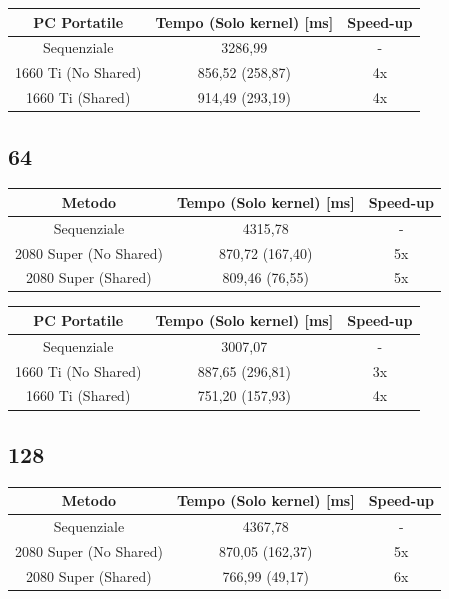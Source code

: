 \documentclass[12pt,a4paper]{report}
\begin{document}
				\bigbreak
				
				\begin{tabular}{|c|c|c|}
					\hline
					PC Portatile & Tempo (Solo kernel) [ms] & Speed-up \\
					\hline
					Sequenziale & 3286,99 & -  \\
					\hline
					1660 Ti (No Shared) & 856,52 (258,87) & 4x \\
					\hline
					1660 Ti (Shared) & 914,49 (293,19) & 4x \\
					\hline
				\end{tabular}

			\subsection{64}
			
				\begin{tabular}{|c|c|c|}
					\hline
					Metodo & Tempo (Solo kernel) [ms] & Speed-up \\
					\hline
					Sequenziale & 4315,78 & -  \\
					\hline
					2080 Super (No Shared) & 870,72 (167,40) & 5x \\
					\hline
					2080 Super (Shared) & 809,46 (76,55) & 5x \\
					\hline
				\end{tabular}
				
				\bigbreak
				
				\begin{tabular}{|c|c|c|}
					\hline
					PC Portatile & Tempo (Solo kernel) [ms] & Speed-up \\
					\hline
					Sequenziale & 3007,07 & -  \\
					\hline
					1660 Ti (No Shared) & 887,65 (296,81) & 3x \\
					\hline
					1660 Ti (Shared) & 751,20 (157,93) & 4x \\
					\hline
				\end{tabular}

			\subsection{128}
			
				\begin{tabular}{|c|c|c|}
					\hline
					Metodo & Tempo (Solo kernel) [ms] & Speed-up \\
					\hline
					Sequenziale & 4367,78 & -  \\
					\hline
					2080 Super (No Shared) & 870,05 (162,37) & 5x \\
					\hline
					2080 Super (Shared) & 766,99 (49,17) & 6x \\
					\hline
				\end{tabular}
				
\end{document}
